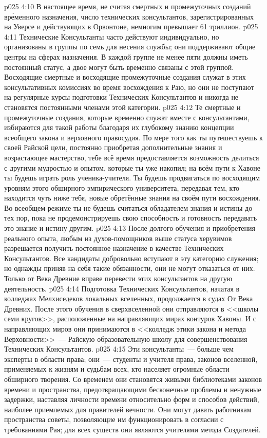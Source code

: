 \vs p025 4:10 \pc В настоящее время, не считая смертных и промежуточных созданий вр\'еменного назначения, число технических консультантов, зарегистрированных на Уверсе и действующих в Орвонтоне, немногим превышает 61 триллион.
\vs p025 4:11 Технические Консультанты часто действуют индивидуально, но организованы в группы по семь для несения службы; они поддерживают общие центры на сферах назначения. В каждой группе не менее пяти должны иметь постоянный статус, а двое могут быть временно связаны с этой группой. Восходящие смертные и восходящие промежуточные создания служат в этих консультативных комиссиях во время восхождения к Раю, но они не поступают на регулярные курсы подготовки Технических Консультантов и никогда не становятся постоянными членами этой категории.
\vs p025 4:12 Те смертные и промежуточные создания, которые временно служат вместе с консультантами, избираются для такой работы благодаря их глубокому знанию концепции всеобщего закона и верховного правосудия. По мере того как ты путешествуешь к своей Райской цели, постоянно приобретая дополнительные знания и возрастающее мастерство, тебе всё время предоставляется возможность делиться с другими мудростью и опытом, которые ты уже накопил; на всём пути к Хавоне ты будешь играть роль ученика\hyp{}учителя. Ты будешь продвигаться по восходящим уровням этого обширного эмпирического университета, передавая тем, кто находится чуть ниже тебя, новые обретённые знания на своём пути восхождения. Во всеобщем режиме ты не будешь считаться обладателем знания и истины до тех пор, пока не продемонстрируешь свою способность и готовность передавать это знание и истину другим.
\vs p025 4:13 После долгого обучения и приобретения реального опыта, любым из духов\hyp{}помощников выше статуса херувимов разрешается получить постоянное назначение в качестве Технических Консультантов. Все кандидаты добровольно вступают в эту категорию служения; но однажды приняв на себя такие обязанности, они не могут отказаться от них. Только от Века Древние вправе перевести этих консультантов на другую деятельность.
\vs p025 4:14 \pc Подготовка Технических Консультантов, начатая в колледжах Мелхиседеков локальных вселенных, продолжается в судах От Века Древних. После этого обучения в сверхвселенной они отправляются в <<школы семи кругов>>, расположенные на направляющих мирах контуров Хавоны. И с направляющих миров они принимаются в <<колледж этики закона и метода Верховности>>~--- Райскую образовательную школу для совершенствования Технических Консультантов.
\vs p025 4:15 Эти консультанты~--- больше чем эксперты в области права; они~--- студенты и учителя  права, законов вселенной, применяемых к жизням и судьбам всех, кто населяет огромные области обширного творения. Со временем они становятся живыми библиотеками законов времени и пространства, предотвращающими бесконечные проблемы и ненужные задержки, наставляя личности времени относительно форм и способов действий, наиболее приемлемых для правителей вечности. Они могут давать работникам пространства советы, позволяющие им функционировать в согласии с требованиями Рая; для всех существ они являются учителями метода Создателей.
